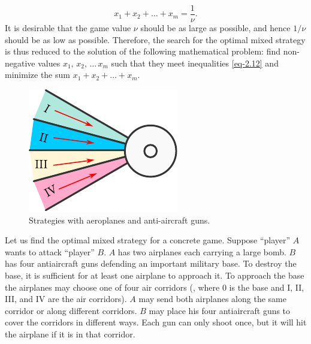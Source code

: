 \begin{equation}%
x_{1} + x_{2}+ \ldots + x_{m} = \frac{1}{\nu}. 
\label{eq-2.13}
\end{equation}
It is desirable that the game value $\nu$ should be as large as possible,
and hence $1/\nu$ should be as low as possible. Therefore, the search for the
optimal mixed strategy is thus reduced to the solution of the following
mathematical problem: find non-negative values $x_{1}, \, x_{2}, \, \ldots \, x_{m}$ such that they meet inequalities \eqref{eq-2.12} and minimize the sum $x_{1} + x_{2}+ \ldots{} + x_{m}$.

 \begin{figure}
 \centering
 \includegraphics[width=0.9\linewidth]{figures/anti-aircraft.pdf}
\caption{Strategies with aeroplanes and anti-aircraft guns.\label{anti-aircraft}}
 \end{figure}

 Let us find the optimal mixed
strategy for a concrete game. Suppose ``player'' $A$ wants to attack
``player'' $B$. $A$ has two airplanes each carrying a large bomb. $B$ has four
antiaircraft guns defending an important military base. To destroy the
base, it is sufficient for at least one airplane to approach it. To approach
the base the airplanes may choose one of four air corridors (, where 0 is the base and I, II, III, and IV are the air corridors). $A$ may send both airplanes along the same corridor or along different corridors. $B$ may place his four antiaircraft guns to cover the corridors in different ways. Each gun can only shoot once, but it will hit the airplane if it is in that corridor.
 
